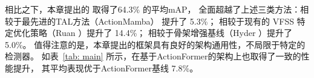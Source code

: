 相比之下，本章提出的 \sexyname 取得了64.3\% 的平均mAP，
全面超越了上述三类方法：相较于最先进的TAL方法（ActionMamba） 提升了 5.3\%；
相较于现有的 VFSS 特定优化策略（Ruan \etal）提升了 14.4\%；
相较于骨架增强基线（Hyder \etal）提升了5.0\%。
值得注意的是，本章提出的框架具有良好的架构通用性，不局限于特定的检测器。
如表~\ref{tab: main} 所示，\sexyname 在基于ActionFormer的架构上也取得了一致的性能提升，
其平均表现优于ActionFormer基线 7.8\%。




